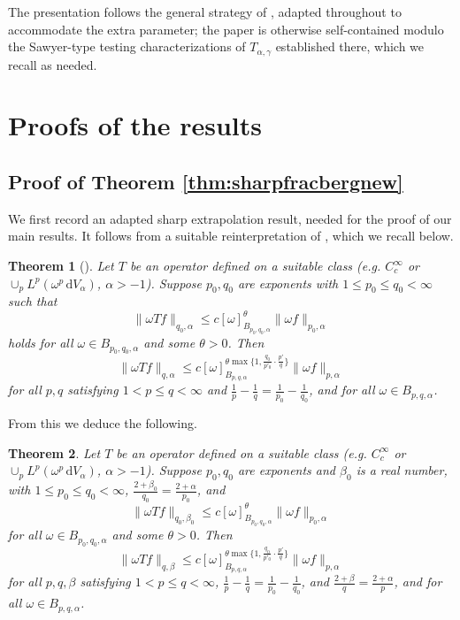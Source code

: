 \documentclass[a4paper,11pt,intlimits,oneside]{amsart}
\newtheorem{theorem}{Theorem}[section]
\theoremstyle{definition}
\numberwithin{equation}{section}
\theoremstyle{definition}
\begin{document}
The presentation follows the general strategy of \cite{Sehba6}, adapted throughout to accommodate the extra parameter; the paper is otherwise self-contained modulo the Sawyer-type testing characterizations of $T_{\alpha,\gamma}$ established there, which we recall as needed.

\section{Proofs of the results}
\subsection{Proof of Theorem \ref{thm:sharpfracbergnew}}
We first record an adapted sharp extrapolation result, needed for the proof of our main results. It follows from a suitable reinterpretation of \cite[Theorem 6]{Sehba6}, which we recall below.
\begin{theorem}[{\cite[Theorem 6]{Sehba6}}]\label{thm:Sehba6}
Let $T$ be an operator defined on a suitable class (e.g. $C_c^{\infty}$ or $\cup_p L^p(\omega^p\,\mathrm{d}V_{\alpha})$, $\alpha>-1$). Suppose $p_0,q_0$ are exponents with $1\le p_0\le q_0<\infty$ such that
$$\|\omega Tf\|_{q_0,\alpha}\le c[\omega]^{\theta}_{B_{p_0,q_0,\alpha}}\|\omega f\|_{p_0,\alpha}$$
holds for all $\omega\in B_{p_0,q_0,\alpha}$ and some $\theta>0$. Then
$$\|\omega Tf\|_{q,\alpha}\le c[\omega]^{\theta\max\{1,\frac{q_0}{p'_0}\cdot\frac{p'}{q}\}}_{B_{p,q,\alpha}}\|\omega f\|_{p,\alpha}$$
for all $p,q$ satisfying $1<p\le q<\infty$ and $\frac{1}{p} - \frac{1}{q} = \frac{1}{p_0} - \frac{1}{q_0}$, and for all $\omega\in B_{p,q,\alpha}$.
\end{theorem}
From this we deduce the following.
\begin{theorem}\label{thm:sharpextra}
Let $T$ be an operator defined on a suitable class (e.g. $C_c^{\infty}$ or $\cup_p L^p(\omega^p\,\mathrm{d}V_{\alpha})$, $\alpha>-1$). Suppose $p_0,q_0$ are exponents and $\beta_0$ is a real number, with $1\le p_0\le q_0<\infty$, $\frac{2+\beta_0}{q_0}= \frac{2+\alpha}{p_0}$, and
$$\|\omega Tf\|_{q_0,\beta_0}\le c[\omega]^{\theta}_{B_{p_0,q_0,\alpha}}\|\omega f\|_{p_0,\alpha}$$
for all $\omega\in B_{p_0,q_0,\alpha}$ and some $\theta>0$. Then
$$\|\omega Tf\|_{q,\beta}\le c[\omega]^{\theta\max\{1,\frac{q_0}{p'_0}\cdot\frac{p'}{q}\}}_{B_{p,q,\alpha}}\|\omega f\|_{p,\alpha}$$
for all $p,q,\beta$ satisfying $1<p\le q<\infty$, $\frac{1}{p} - \frac{1}{q} = \frac{1}{p_0} - \frac{1}{q_0}$, and $\frac{2+\beta}{q} = \frac{2+\alpha}{p}$, and for all $\omega\in B_{p,q,\alpha}$.
\end{theorem}
\end{document}
